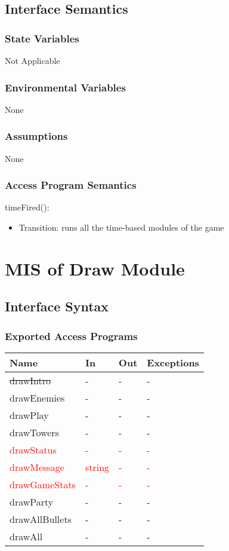 \documentclass[12,english]{article}
\begin{document}
\subsection{Interface Semantics}
\subsubsection{State Variables}
Not Applicable 
\subsubsection{Environmental Variables}
None
\subsubsection{Assumptions}
None
\subsubsection{Access Program Semantics}

\noindent timeFired():
\begin{itemize}
    \item Transition: runs all the time-based modules of the game
\end{itemize}

\section{MIS of Draw Module}
\subsection{Interface Syntax}
\subsubsection{Exported Access Programs}
\begin{table}[h!]
    \centering
    \begin{tabular}{|p{4cm}|p{2cm}|p{2cm}|p{2cm}|}
    \hline
    \textbf {Name}  & {In} & {Out} & {Exceptions} \\
    \hline
    \st{drawIntro} & - & - & -\\
    \hline 
    drawEnemies & - & - & -\\
    \hline 
    drawPlay & - & - & -\\
    \hline 
    drawTowers & - & - & -\\
    \hline 
    \textcolor{red}{drawStatus} & \textcolor{red}{-} & \textcolor{red}{-} & \textcolor{red}{-}\\
    \hline
    \textcolor{red}{drawMessage} & \textcolor{red}{string} & \textcolor{red}{-} & \textcolor{red}{-}\\
    \hline
    \textcolor{red}{drawGameStats} & \textcolor{red}{-} & \textcolor{red}{-} & \textcolor{red}{-}\\
    \hline
    drawParty & - & - & -\\
    \hline 
    drawAllBullets & - & - & -\\
    \hline 
    drawAll & - & - & -\\
    \hline 
    \end{tabular}
\end{table}
\end{document}
